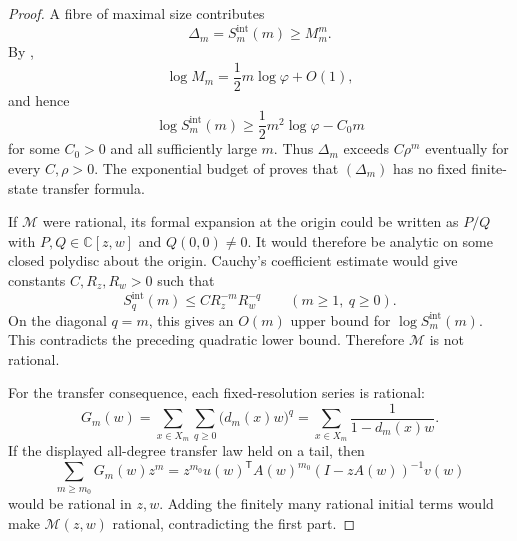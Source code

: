 \begin{proof}
A fibre of maximal size contributes
\[
  \Delta_m=S_m^{\mathrm{int}}(m)\ge M_m^m.
\]
By ,
\[
  \log M_m=\frac12m\log\varphi+O(1),
\]
and hence
\[
  \log S_m^{\mathrm{int}}(m)
  \ge\frac12m^2\log\varphi-C_0m
\]
for some \(C_0>0\) and all sufficiently large \(m\).  Thus \(\Delta_m\) exceeds
\(C\rho^m\) eventually for every \(C,\rho>0\).  The
exponential budget of  proves that
\((\Delta_m)\) has no fixed finite-state transfer formula.

If \(\mathcal M\) were rational, its formal expansion at the origin could be
written as \(P/Q\) with \(P,Q\in\mathbb C[z,w]\) and \(Q(0,0)\ne0\).  It would
therefore be analytic on some closed polydisc about the origin.  Cauchy's
coefficient estimate would give constants \(C,R_z,R_w>0\) such that
\[
  S_q^{\mathrm{int}}(m)\le C R_z^{-m}R_w^{-q}
  \qquad(m\ge1,\ q\ge0).
\]
On the diagonal \(q=m\), this gives an \(O(m)\) upper bound for
\(\log S_m^{\mathrm{int}}(m)\).
This contradicts the preceding quadratic lower bound.  Therefore
\(\mathcal M\) is not rational.

For the transfer consequence, each fixed-resolution series is rational:
\[
  G_m(w)
  =\sum_{x\in X_m}\sum_{q\ge0}\bigl(d_m(x)w\bigr)^q
  =\sum_{x\in X_m}\frac1{1-d_m(x)w}.
\]
If the displayed all-degree transfer law held on a tail, then
\[
  \sum_{m\ge m_0}G_m(w)z^m
  =z^{m_0}u(w)^{\mathsf T}A(w)^{m_0}
    (I-zA(w))^{-1}v(w)
\]
would be rational in \(z,w\).  Adding the finitely many rational initial
terms would make \(\mathcal M(z,w)\) rational, contradicting the first part.
\end{proof}


